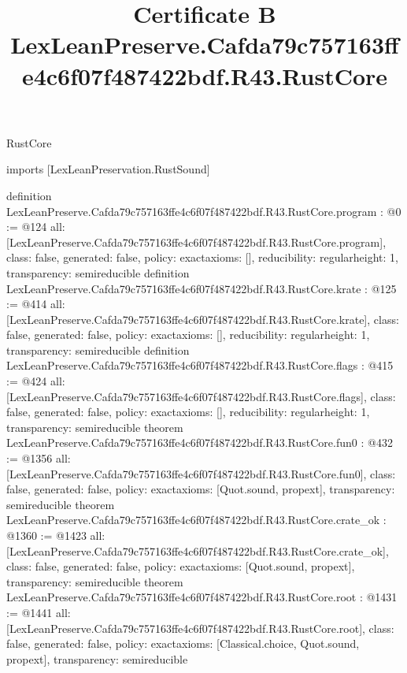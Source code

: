 \begin{lexlean}{RustCore}
\title{Certificate B LexLeanPreserve.Cafda79c757163ffe4c6f07f487422bdf.R43.RustCore}
\begin{coremodule}
imports [LexLeanPreservation.RustSound]

definition LexLeanPreserve.Cafda79c757163ffe4c6f07f487422bdf.R43.RustCore.program : @0 := @124 {
  all: [LexLeanPreserve.Cafda79c757163ffe4c6f07f487422bdf.R43.RustCore.program],
  class: false,
  generated: false,
  policy: exact{axioms: []},
  reducibility: regular{height: 1},
  transparency: semireducible
}
definition LexLeanPreserve.Cafda79c757163ffe4c6f07f487422bdf.R43.RustCore.krate : @125 := @414 {
  all: [LexLeanPreserve.Cafda79c757163ffe4c6f07f487422bdf.R43.RustCore.krate],
  class: false,
  generated: false,
  policy: exact{axioms: []},
  reducibility: regular{height: 1},
  transparency: semireducible
}
definition LexLeanPreserve.Cafda79c757163ffe4c6f07f487422bdf.R43.RustCore.flags : @415 := @424 {
  all: [LexLeanPreserve.Cafda79c757163ffe4c6f07f487422bdf.R43.RustCore.flags],
  class: false,
  generated: false,
  policy: exact{axioms: []},
  reducibility: regular{height: 1},
  transparency: semireducible
}
theorem LexLeanPreserve.Cafda79c757163ffe4c6f07f487422bdf.R43.RustCore.fun0 : @432 := @1356 {
  all: [LexLeanPreserve.Cafda79c757163ffe4c6f07f487422bdf.R43.RustCore.fun0],
  class: false,
  generated: false,
  policy: exact{axioms: [Quot.sound, propext]},
  transparency: semireducible
}
theorem LexLeanPreserve.Cafda79c757163ffe4c6f07f487422bdf.R43.RustCore.crate_ok : @1360 := @1423 {
  all: [LexLeanPreserve.Cafda79c757163ffe4c6f07f487422bdf.R43.RustCore.crate_ok],
  class: false,
  generated: false,
  policy: exact{axioms: [Quot.sound, propext]},
  transparency: semireducible
}
theorem LexLeanPreserve.Cafda79c757163ffe4c6f07f487422bdf.R43.RustCore.root : @1431 := @1441 {
  all: [LexLeanPreserve.Cafda79c757163ffe4c6f07f487422bdf.R43.RustCore.root],
  class: false,
  generated: false,
  policy: exact{axioms: [Classical.choice, Quot.sound, propext]},
  transparency: semireducible
}


\end{coremodule}
\end{lexlean}

